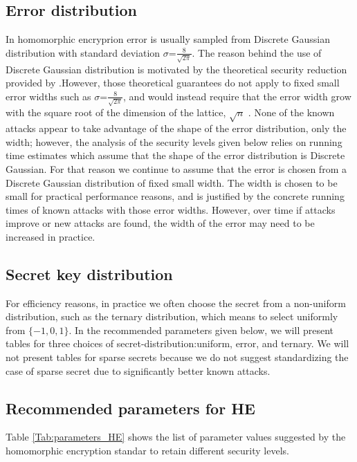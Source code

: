 \subsection{Error distribution} In homomorphic encryprion error is usually sampled from Discrete Gaussian distribution with standard deviation $\sigma$=$\frac{8}{\sqrt{2\pi}}$. The reason behind the use of Discrete Gaussian distribution is motivated by the theoretical security reduction provided by \cite{lyubashevsky2013ideal}.However, those theoretical guarantees do not apply to fixed small error widths such as $\sigma$=$\frac{8}{\sqrt{2\pi}}$, and would instead require that the error width grow with the square root of the dimension of the lattice, $\sqrt{n}$ . None of the known attacks appear to take advantage of the shape of the error distribution, only the width; however, the analysis of the security levels given below relies on running time estimates which assume that the shape of the error distribution is Discrete Gaussian. For that reason we continue to assume that the error is chosen from a Discrete Gaussian distribution of fixed small width. The width is chosen to be small for practical performance reasons, and is justified by the concrete running times of known attacks with those error widths. However, over time if attacks improve or new attacks are found, the width of the error may need to be increased in practice.

\subsection{Secret key distribution} For efficiency reasons, in practice we often choose the secret from a non-uniform distribution, such as the ternary distribution, which means to select uniformly from $\{-1,0,1\}$. In the recommended parameters given below, we will present tables for three choices of secret-distribution:{uniform, error, and ternary}. We will not present tables for sparse secrets because we do not suggest standardizing the case of sparse secret due to significantly better known attacks.


\subsection{Recommended parameters for HE}
Table \ref{Tab:parameters_HE} shows the list of parameter values suggested by the homomorphic encryption standar to retain
different security levels.


